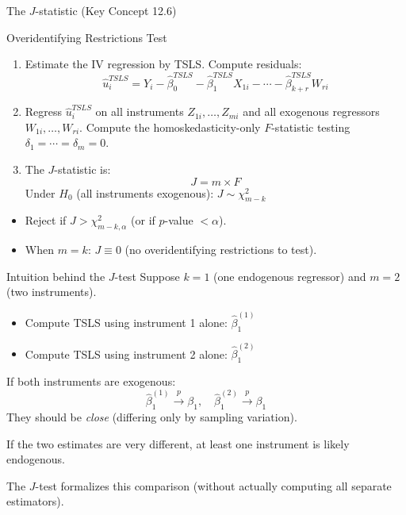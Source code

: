 \documentclass[10pt]{beamer}
\begin{document}
\begin{frame}{The $J$-statistic (Key Concept 12.6)}
\label{slide:j_test}
\begin{block}{Overidentifying Restrictions Test}
\begin{enumerate}
  \item Estimate the IV regression by TSLS. Compute residuals:
  \[
  \widehat{u}_i^{TSLS} = Y_i - \widehat{\beta}_0^{TSLS} - \widehat{\beta}_1^{TSLS}X_{1i} - \cdots - \widehat{\beta}_{k+r}^{TSLS}W_{ri}
  \]

  \item Regress $\widehat{u}_i^{TSLS}$ on all instruments $Z_{1i},\ldots,Z_{mi}$ and all exogenous regressors $W_{1i},\ldots,W_{ri}$. Compute the homoskedasticity-only $F$-statistic testing $\delta_1 = \cdots = \delta_m = 0$.

  \item The $J$-statistic is:
  \[
  J = m \times F
  \]
  Under $H_0$ (all instruments exogenous): $J \sim \chi^2_{m-k}$
\end{enumerate}
\end{block}

\pause
\begin{itemize}
  \item Reject if $J > \chi^2_{m-k,\alpha}$ (or if $p$-value $< \alpha$).
  \item When $m = k$: $J \equiv 0$ (no overidentifying restrictions to test).
\end{itemize}
\end{frame}

\begin{frame}{Intuition behind the $J$-test}
\label{slide:j_intuition}
Suppose $k=1$ (one endogenous regressor) and $m=2$ (two instruments).

\begin{itemize}
  \item Compute TSLS using instrument 1 alone: $\widehat{\beta}_{1}^{(1)}$
  \item Compute TSLS using instrument 2 alone: $\widehat{\beta}_{1}^{(2)}$
\end{itemize}

\pause
\vspace{0.5em}
If both instruments are exogenous:
\[
\widehat{\beta}_1^{(1)} \xrightarrow{p} \beta_1, \quad \widehat{\beta}_1^{(2)} \xrightarrow{p} \beta_1
\]
They should be \emph{close} (differing only by sampling variation).

\pause
\vspace{0.5em}
If the two estimates are \alert{very different}, at least one instrument is likely endogenous.

\vspace{0.5em}
The $J$-test formalizes this comparison (without actually computing all separate estimators).
\end{frame}
\end{document}

